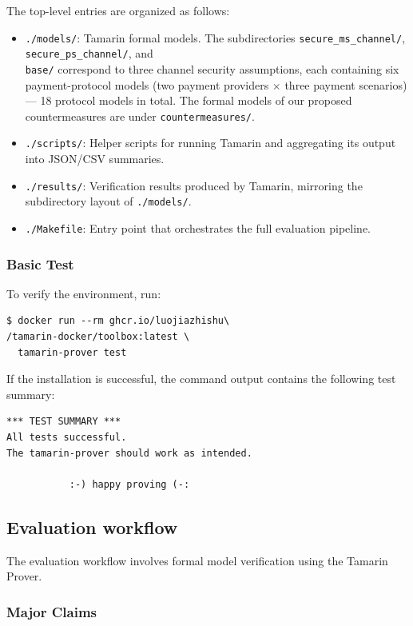 The top-level entries are organized as follows:
\begin{itemize}[itemsep=1pt, topsep=2pt, parsep=0pt, partopsep=0pt]
    \item \texttt{./models/}: Tamarin formal models. The subdirectories \texttt{secure\_ms\_channel/}, \texttt{secure\_ps\_channel/}, and \\
    \texttt{base/} correspond to three channel security assumptions,
    each containing six payment-protocol models (two payment providers $\times$ three payment scenarios) --- 18 protocol models in total. The formal models of our proposed countermeasures are under \texttt{countermeasures/}.
    \item \texttt{./scripts/}: Helper scripts for running Tamarin and aggregating its output into JSON/CSV summaries.
    \item \texttt{./results/}: Verification results produced by Tamarin, mirroring the subdirectory layout of \texttt{./models/}.
    \item \texttt{./Makefile}: Entry point that orchestrates the full evaluation pipeline.
\end{itemize}

\subsubsection{Basic Test}
To verify the environment, run:

\begin{verbatim}
$ docker run --rm ghcr.io/luojiazhishu\
/tamarin-docker/toolbox:latest \
  tamarin-prover test
\end{verbatim}

If the installation is successful, the command output contains the following test summary:
\begin{verbatim}
*** TEST SUMMARY ***
All tests successful.
The tamarin-prover should work as intended.

           :-) happy proving (-:
\end{verbatim}


\subsection{Evaluation workflow}
The evaluation workflow involves formal model verification using the Tamarin Prover.

\subsubsection{Major Claims}


